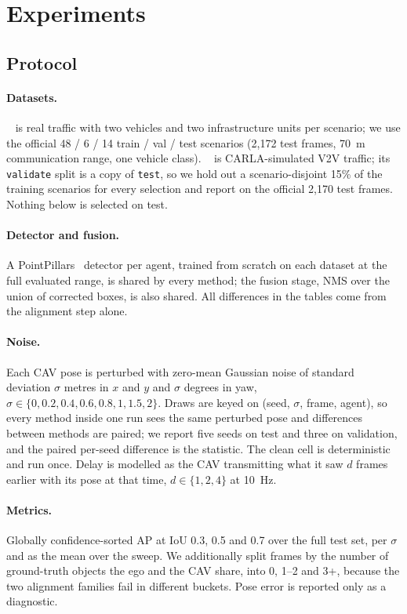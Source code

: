 \section{Experiments}
\label{sec:experiments}

\subsection{Protocol}
\label{sec:protocol}
\paragraph{Datasets.}
\vxreal~\cite{xiang2024v2xreal} is real traffic with two vehicles and two infrastructure units per scenario; we use the official 48 / 6 / 14 train / val / test scenarios (2,172 test frames, \SI{70}{m} communication range, one vehicle class). \opvv~\cite{xu2022opv2v} is CARLA-simulated V2V traffic; its \texttt{validate} split is a copy of \texttt{test}, so we hold out a scenario-disjoint 15\% of the training scenarios for every selection and report on the official 2,170 test frames. Nothing below is selected on test.

\paragraph{Detector and fusion.}
A PointPillars~\cite{lang2019pointpillars} detector per agent, trained from scratch on each dataset at the full evaluated range, is shared by every method; the fusion stage, NMS over the union of corrected boxes, is also shared. All differences in the tables come from the alignment step alone.

\paragraph{Noise.}
Each CAV pose is perturbed with zero-mean Gaussian noise of standard deviation $\sigma$ metres in $x$ and $y$ and $\sigma$ degrees in yaw, $\sigma\in\{0,0.2,0.4,0.6,0.8,1,1.5,2\}$. Draws are keyed on (seed, $\sigma$, frame, agent), so every method inside one run sees the same perturbed pose and differences between methods are paired; we report five seeds on test and three on validation, and the paired per-seed difference is the statistic. The clean cell is deterministic and run once. Delay is modelled as the CAV transmitting what it saw $d$ frames earlier with its pose at that time, $d\in\{1,2,4\}$ at \SI{10}{Hz}.

\paragraph{Metrics.}
Globally confidence-sorted AP at IoU 0.3, 0.5 and 0.7 over the full test set, per $\sigma$ and as the mean over the sweep. We additionally split frames by the number of ground-truth objects the ego and the CAV share, into 0, 1--2 and 3+, because the two alignment families fail in different buckets. Pose error is reported only as a diagnostic.

